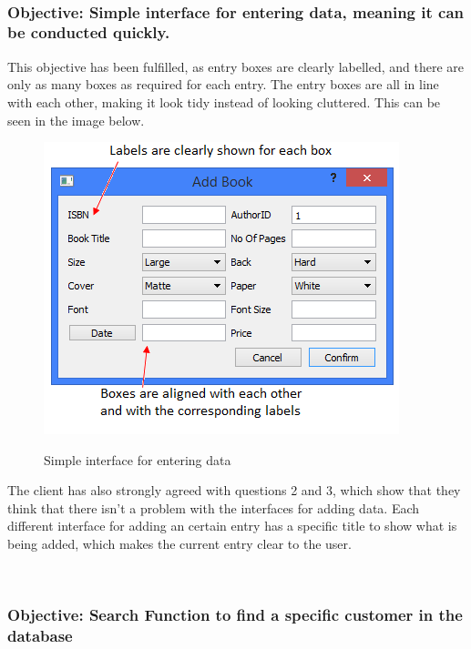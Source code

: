 \

\subsubsection{Objective: Simple interface for entering data, meaning it can be conducted quickly.}

This objective has been fulfilled, as entry boxes are clearly labelled, and there are only as many boxes as required for each entry. The entry boxes are all in line with each other, making it look tidy instead of looking cluttered. This can be seen in the image below.

\begin{figure}[H]
    \includegraphics[width=\textwidth]{./Evaluation/Evidence/AddingInterface.png}
    \label{fig:AddingInterface} \caption{Simple interface for entering data}
\end{figure}

The client has also strongly agreed with questions 2 and 3, which show that they think that there isn't a problem with the interfaces for adding data. Each different interface for adding an certain entry has a specific title to show what is being added, which makes the current entry clear to the user.

\

\subsubsection{Objective: Search Function to find a specific customer in the database}

